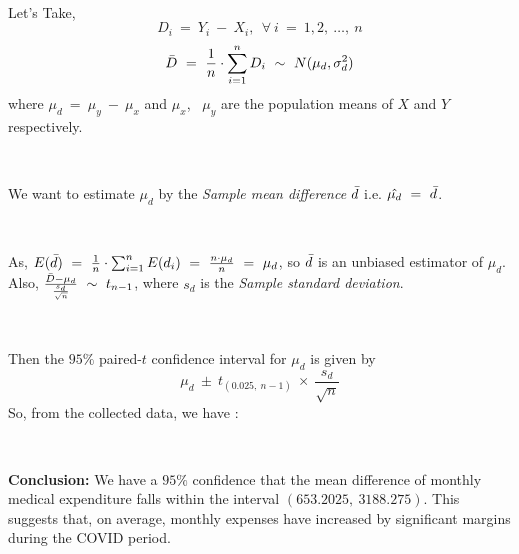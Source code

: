 \ 

Let's Take, 
$$D_{i} \ = \ Y_{i} \ - \ X_{i} , \ \ \forall \ i \ = \ 1, 2,\ \ldots, \ n$$
$$\Bar{D} \ = \ \frac{1}{n} \cdot \sum_{i = 1}^{n} D_{i} \ \sim \ N (\mu_{d}, \sigma_{d}^{2})$$
where $\mu_{d} \ = \ \mu_{y} \ - \ \mu_{x}$ and $\mu_{x}$, \ $\mu_{y}$ are the population means of $X$ and $Y$ respectively.

\ 

We want to estimate $\mu_{d}$ by the \textit{Sample mean difference} $\Bar{d}$ i.e. $\hat{\mu_{d}} \ = \ \Bar{d}$.

\ 

As, $E(\Bar{d}) \ = \ \frac{1}{n} \cdot \sum_{i = 1}^{n} E(d_{i}) \ = \ \frac{n \cdot \mu_{d}}{n} \ = \ \mu_{d}$, so $\Bar{d}$ is an unbiased estimator of $\mu_{d}$.\\

Also, $\frac{\Bar{D} - \mu_{d}}{\frac{s_{d}}{\sqrt{n}}} \ \sim \ t_{n - 1}$, where $s_{d}$ is the \textit{Sample standard deviation}.

\

Then the $95\%$ paired-$t$ confidence interval for $\mu_{d}$ is given by 
$$\mu_{d} \ \pm \ t_{(0.025, \ n-1)} \ \times \ \frac{s_{d}}{\sqrt{n}}$$
So, from the collected data, we have : \\

\ 

\textbf{Conclusion:} We have a $95\%$ confidence that the mean difference of monthly medical expenditure falls within the interval $(653.2025, \ 3188.275)$. This suggests that, on average, monthly expenses have increased by significant margins during the COVID period.